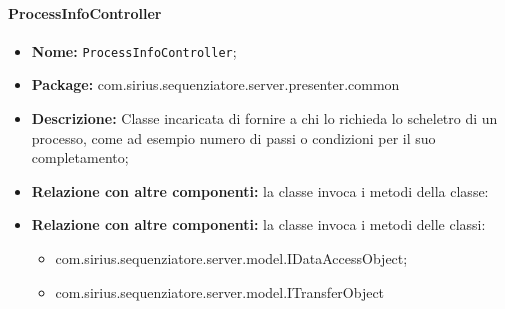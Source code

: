 \paragraph{ProcessInfoController}
	\begin{itemize}
		\item \textbf{Nome:} \texttt{ProcessInfoController};
		\item \textbf{Package:} com.sirius.sequenziatore.server.presenter.common
		\item \textbf{Descrizione:} Classe incaricata di fornire a chi lo richieda lo scheletro di un processo, come ad esempio numero di passi o condizioni per il suo completamento;
		\item \textbf{Relazione con altre componenti:} la classe invoca i metodi della classe:
		\item \textbf{Relazione con altre componenti:} la classe invoca i metodi delle classi:
		\begin{itemize}
			\item com.sirius.sequenziatore.server.model.IDataAccessObject;
			\item com.sirius.sequenziatore.server.model.ITransferObject
		\end{itemize}
	\end{itemize}

